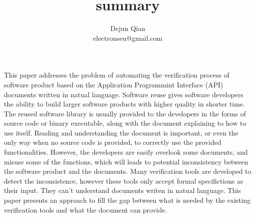 \documentclass[11pt,letterpaper,oneside]{article}
\title{summary}
\author{Dejun Qian\\electronseu@gmail.com}
\date{}
\begin{document}
\maketitle

This paper \cite{bib:Pandita} addresses the problem of automating the verification process of software product based on the Application Programmint Interface (API) documents written in natual language.
Software reuse gives software developers the ability to build larger software products with higher quality in shorter time.
The reused software library is usually provided to the developers in the forms of source code or binary executable,
along with the document explaining to how to use itself.
Reading and understanding the document is important, 
or even the only way when no source code is provided,
to correctly use the provided functionalities.
However, the developers are easily overlook some documents,
and misuse some of the functions,
which will leads to potential inconsistency between the software product and the documents.
Many verification tools are developed to detect the inconsistence,
however these tools only accept formal specifictions as their input.
They can't understand documents writen in natual language.
This paper presents an approach to fill the gap between what is needed by the existing verification tools and what the document can provide.
\end{document}
